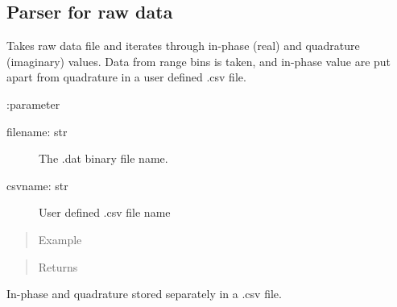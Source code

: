 \documentclass[letterpaper,10pt,english]{sphinxmanual}
\begin{document}
\subsection{Parser for raw data}
\label{\detokenize{X4 radar:parser-for-raw-data}}

\begin{fulllineitems}
Takes raw data file and iterates through in-phase (real) and quadrature (imaginary) values.
Data from range bins is taken, and in-phase value are put apart from quadrature in a user defined .csv file.

:parameter
\begin{description}
\item[{filename: str}] \leavevmode
The .dat binary file name.

\item[{csvname: str}] \leavevmode
User defined .csv file name

\end{description}
\begin{quote}\begin{description}
\item[{Example}] \leavevmode
\end{description}\end{quote}

\begin{sphinxVerbatim}[commandchars=\\\{\}]
\end{sphinxVerbatim}
\begin{quote}\begin{description}
\item[{Returns}] \leavevmode


\end{description}\end{quote}

In-phase and quadrature stored separately in a .csv file.

\end{fulllineitems}
\end{document}
